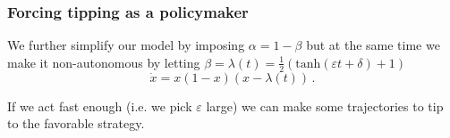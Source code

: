\documentclass[./main.tex]{subfiles}
\begin{document}
\begin{frame}[t, label=slide14]
        \frametitle{Forcing tipping as a policymaker}

        \footnotesize

        We further simplify our model by imposing $\alpha = 1 - \beta$ but  at the same time we make it non-autonomous by letting $\beta = \lambda(t) = \frac{1}{2}(\text{tanh}(\varepsilon t + \delta) + 1)$
        \begin{equation*}
            \dot{x}=x(1-x)(x-\lambda(t))\,. 
        \end{equation*}

        \vspace{1mm}

        If we act fast enough (i.e. we pick $\varepsilon$ large) we can make some trajectories to tip to the favorable strategy.
        
        \vspace{4mm}


 \end{frame}
\end{document}
